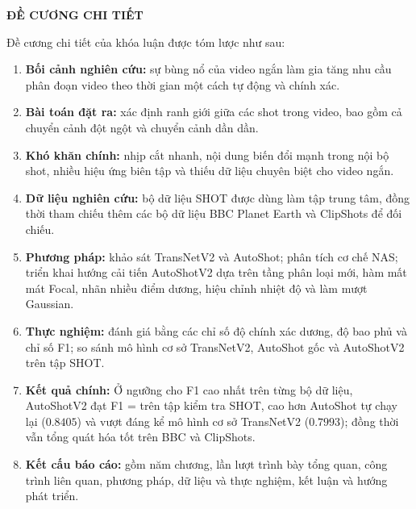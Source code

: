 {}

\begin{center}
{\large\bfseries{ĐỀ CƯƠNG CHI TIẾT}}
\end{center}

Đề cương chi tiết của khóa luận được tóm lược như sau:

\begin{enumerate}
    \item \textbf{Bối cảnh nghiên cứu:} sự bùng nổ của video ngắn làm gia tăng nhu cầu phân đoạn video theo thời gian một cách tự động và chính xác.
    \item \textbf{Bài toán đặt ra:} xác định ranh giới giữa các shot trong video, bao gồm cả chuyển cảnh đột ngột và chuyển cảnh dần dần.
    \item \textbf{Khó khăn chính:} nhịp cắt nhanh, nội dung biến đổi mạnh trong nội bộ shot, nhiều hiệu ứng biên tập và thiếu dữ liệu chuyên biệt cho video ngắn.
    \item \textbf{Dữ liệu nghiên cứu:} bộ dữ liệu SHOT được dùng làm tập trung tâm, đồng thời tham chiếu thêm các bộ dữ liệu BBC Planet Earth và ClipShots để đối chiếu.
    \item \textbf{Phương pháp:} khảo sát TransNetV2 và AutoShot; phân tích cơ chế NAS; triển khai hướng cải tiến AutoShotV2 dựa trên tầng phân loại mới, hàm mất mát Focal, nhãn nhiều điểm dương, hiệu chỉnh nhiệt độ và làm mượt Gaussian.
    \item \textbf{Thực nghiệm:} đánh giá bằng các chỉ số độ chính xác dương, độ bao phủ và chỉ số F1; so sánh mô hình cơ sở TransNetV2, AutoShot gốc và AutoShotV2 trên tập SHOT.
    \item \textbf{Kết quả chính:} Ở ngưỡng cho F1 cao nhất trên từng bộ dữ liệu, AutoShotV2 đạt F1 = \ASVTwoBestShotFOne{} trên tập kiểm tra SHOT, cao hơn AutoShot tự chạy lại ($0.8405$) và vượt đáng kể mô hình cơ sở TransNetV2 ($0.7993$); đồng thời vẫn tổng quát hóa tốt trên BBC và ClipShots.
    \item \textbf{Kết cấu báo cáo:} gồm năm chương, lần lượt trình bày tổng quan, công trình liên quan, phương pháp, dữ liệu và thực nghiệm, kết luận và hướng phát triển.
\end{enumerate}
